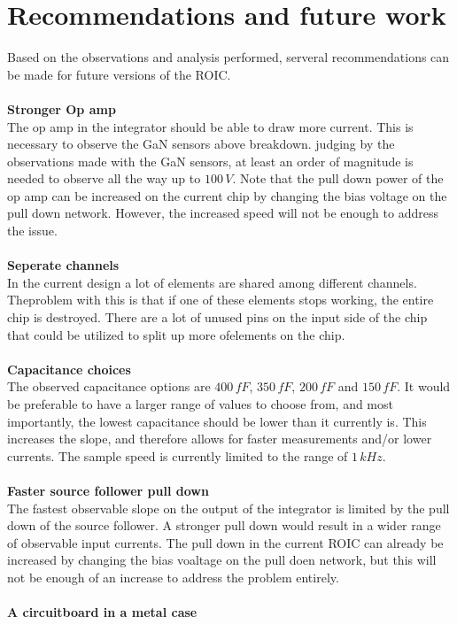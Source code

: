 \section{Recommendations and future work}
Based on the observations and analysis performed, serveral recommendations can be made for future versions of the ROIC.\\
\\
\textbf{Stronger Op amp}\\
The op amp in the integrator should be able to draw more current. This is necessary to observe the GaN sensors above breakdown. judging by the observations made with the GaN sensors, at least an order of magnitude is needed to observe all the way up to $100\,V$. Note that the pull down power of the op amp can be increased on the current chip by changing the bias voltage on the pull down network. However, the increased speed will not be enough to address the issue.\\
\\
\textbf{Seperate channels}\\
In the current design a lot of elements are shared among different channels. Theproblem with this is that if one of these elements stops working, the entire chip is destroyed. There are a lot of unused pins on the input side of the chip that could be utilized to split up more ofelements on the chip.\\
\\
\textbf{Capacitance choices}\\
The observed capacitance options are $400\,fF$, $350\,fF$, $200\,fF$ and $150\,fF$. It would be preferable to have a larger range of values to choose from, and most importantly, the lowest capacitance should be lower than it currently is. This increases the slope, and therefore allows for faster measurements and/or lower currents. The sample speed is currently limited to the range of $1\,kHz$. \\
\\
\textbf{Faster source follower pull down}\\
The fastest observable slope on the output of the integrator is limited by the pull down of the source follower. A stronger pull down would result in a wider range of observable input currents. The pull down in the current ROIC can already be increased by changing the bias voaltage on the pull doen network, but this will not be enough of an increase to address the problem entirely.\\
\\
\textbf{A circuitboard in a metal case}\\
